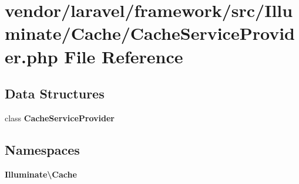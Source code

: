 \section{vendor/laravel/framework/src/\+Illuminate/\+Cache/\+Cache\+Service\+Provider.php File Reference}
\label{_cache_service_provider_8php}
\subsection*{Data Structures}
\begin{DoxyCompactItemize}
\item 
class {\bf Cache\+Service\+Provider}
\end{DoxyCompactItemize}
\subsection*{Namespaces}
\begin{DoxyCompactItemize}
\item 
 {\bf Illuminate\textbackslash{}\+Cache}
\end{DoxyCompactItemize}

